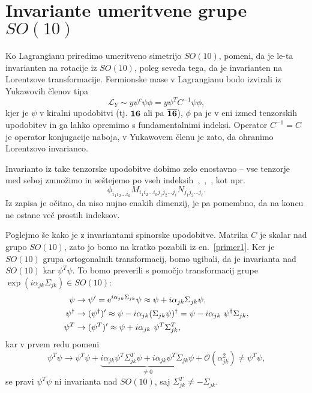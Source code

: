 \section{Invariante umeritvene grupe $SO(10)$}

Ko Lagrangianu priredimo umeritveno simetrijo $SO(10)$, pomeni, da je le-ta invarianten na
rotacije iz $SO(10)$, poleg seveda tega, da je invarianten na Lorentzove transformacije.
Fermionske mase v Lagrangianu bodo izvirali iz Yukawovih členov tipa~\cite{mohapatra}
\begin{equation}
	\mathcal{L}_Y \sim y \psi^c \psi \phi =  y\psi^T C^{-1} \psi \phi,
	\label{primer1}
\end{equation}
kjer je $\psi$ v kiralni upodobitvi (tj. $\mathbf{16}$ ali pa $\overline{\mathbf{16}}$), $\phi$ pa je v eni izmed
tenzorskih upodobitev in ga lahko opremimo s fundamentalnimi indeksi. Operator $C^{-1} = C$ je
operator konjugacije naboja, v Yukawovem členu je zato, da ohranimo Lorentzovo invarianco.

Invarianto iz take tenzorske upodobitve dobimo zelo enostavno -- vse tenzorje med seboj zmnožimo 
in seštejemo po vseh indeksih~\cite{gutproton},~\cite{miha},~\cite{mohapatra}, kot npr.
\begin{equation}
	\phi_{i_1i_2\dots i_k} M_{i_1i_2\dots i_kj_1j_2\dots j_\ell} N_{j_1j_2\dots j_\ell}.
	\label{tenzorji}
\end{equation}
Iz zapisa je očitno, da niso nujno enakih dimenzij, je pa pomembno, da na koncu ne ostane več prostih
indeksov.

Poglejmo še kako je z invariantami spinorske upodobitve. Matrika $C$ je skalar nad grupo $SO(10)$,
zato jo bomo na kratko pozabili iz en.~\eqref{primer1}. Ker je $SO(10)$ grupa ortogonalnih
transformacij, bomo ugibali, da je invarianta nad $SO(10)$ kar $\psi^T \psi$. To bomo preverili s
pomočjo transformacij grupe $\exp(i\alpha_{jk}\Sigma_{jk}) \in SO(10)$:
\begin{align}
	\psi &\to \psi' = \e^{i\alpha_{jk}\Sigma_{jk}} \psi \approx \psi
		+ i\alpha_{jk}\Sigma_{jk}\psi, \notag \\
	\psi^\dagger &\to (\psi^\dagger)' \approx \psi - i\alpha_{jk}(\Sigma_{jk}\psi)^\dagger
		= \psi - i\alpha_{jk}\ \psi^\dagger\Sigma_{jk},
		\notag \\
	\psi^T &\to (\psi^T)' \approx \psi + i\alpha_{jk}\ \psi^T\Sigma_{jk}^T,
\end{align}
kar v prvem redu pomeni
\begin{equation}
	\psi^T\psi \to \psi^T\psi + \underbrace{i\alpha_{jk}\psi^T\Sigma_{jk}^T\psi +
		i\alpha_{jk}\psi^T\Sigma_{jk}\psi}_{\neq 0} + \mathcal{O}(\alpha_{jk}^2) \neq \psi^T\psi,
	\label{zagata}
\end{equation}
se pravi $\psi^T\psi$ ni invarianta nad $SO(10)$, saj $\Sigma^T_{jk} \neq -\Sigma_{jk}$.

